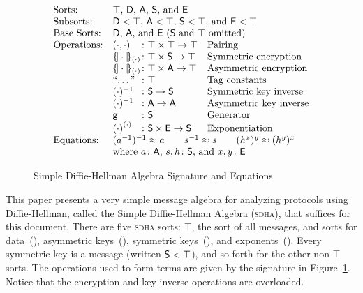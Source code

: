 \documentclass[12pt]{article}
\newcommand{\sdha}{\textsc{sdha}}
\newcommand{\gen}{\ensuremath{\cn{g}}}
\begin{document}
\begin{figure}
$$\begin{array}{ll@{{}\colon{}}ll}
\mbox{Sorts:}&\multicolumn{3}{l}{\mbox{$\top$, \srt{D}, \srt{A}, \srt{S}, and \srt{E}}}\\
\mbox{Subsorts:}&\multicolumn{3}{l}{\mbox{$\srt{D}<\top$,
$\srt{A}<\top$, $\srt{S}<\top$, and $\srt{E}<\top$}}\\
\mbox{Base Sorts:}&\multicolumn{3}{l}{\mbox{\srt{D}, \srt{A}, and \srt{E} (\srt{S} and
$\top$ omitted)}}\\
\mbox{Operations:}&(\cdot,\cdot)&\top\times\top\to\top& \mbox{Pairing}\\
&\enc{\cdot}{(\cdot)}&\top\times\srt{S}\to\top& \mbox{Symmetric encryption}\\
&\enc{\cdot}{(\cdot)}&\top\times\srt{A}\to\top& \mbox{Asymmetric encryption}\\
&\mbox{``\ldots''}&\top&\mbox{Tag constants}\\
&(\cdot)^{-1}&\srt{S}\to\srt{S}& \mbox{Symmetric key inverse}\\
&(\cdot)^{-1}&\srt{A}\to\srt{A}& \mbox{Asymmetric key inverse}\\
&\gen&\srt{S}&\mbox{Generator}\\
&{(\cdot)}^{(\cdot)}&\srt{S}\times\srt{E}\to\srt{S}&\mbox{Exponentiation}\\
\mbox{Equations:}&\multicolumn{3}{l}{(a^{-1})^{-1}\approx a\qquad
  s^{-1}\approx s\qquad (h^x)^y\approx (h^y)^x}\\
&\multicolumn{3}{l}{\mbox{where $a\colon\srt{A}$, $s,h\colon\srt{S}$, and $x,y\colon\srt{E}$}}
\end{array}$$
\caption{Simple Diffie-Hellman Algebra Signature and
  Equations}\label{fig:dh signature}
\end{figure}

This paper presents a very simple message algebra for analyzing
protocols using Diffie-Hellman, called the Simple Diffie-Hellman
Algebra (\sdha), that suffices for this document.  There are five
{\sdha} sorts: $\top$, the sort of all messages, and sorts for
data~(), asymmetric keys~(), symmetric keys~(),
and exponents~().  Every symmetric key is a message (written
$\mathsf{S}<\top$), and so forth for the other non-$\top$ sorts.  The
operations used to form terms are given by the signature in
Figure~\ref{fig:dh signature}.  Notice that the encryption and key
inverse operations are overloaded.
\end{document}
